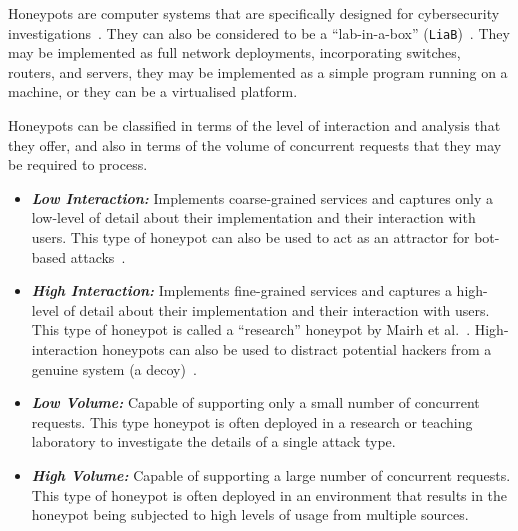 \documentclass{ieeeaccess}
\begin{document}
Honeypots are computer systems that are specifically designed for
cybersecurity investigations~\cite{FKAS:17,BCF:12}. They can also be considered to be a ``lab-in-a-box'' (\texttt{LiaB})~\cite{CFDMH:09}. They may be
implemented as full network deployments, incorporating switches, routers, and
servers, they may be implemented as a simple program running on a machine, or they can be a virtualised platform. 

Honeypots can be classified in terms of the level of interaction and
analysis that they offer, and also in terms of the volume of concurrent requests
that they may be required to process.

\begin{itemize}

  \item \noindent \emph{\textbf{Low Interaction:}} Implements coarse-grained
    services and captures only a low-level of detail about their implementation
    and their interaction with users.  This type of honeypot can also be used
    to act as an attractor for bot-based attacks~\cite{SZB:16}.  

  \item \noindent \emph{\textbf{High Interaction:}} Implements fine-grained
    services and captures a high-level of detail about their implementation and
    their interaction with users.  This type of honeypot is called a
    ``research'' honeypot by Mairh et al.~\cite{MBVJ:11}. High-interaction
    honeypots can also be used to distract potential hackers from a genuine
    system (a decoy)~\cite{M:06,SNKA:12}.

\end{itemize}


\begin{itemize}

  \item \noindent \emph{\textbf{Low Volume:}} Capable of supporting only a
    small number of concurrent requests.  This type honeypot is often deployed
    in a research or teaching laboratory to investigate the details of a single
    attack type.

  \item \noindent \emph{\textbf{High Volume:}} Capable of supporting a large
    number of concurrent requests. This type of honeypot is often deployed in
    an environment that results in the honeypot being subjected to high levels
    of usage from multiple sources. 

\end{itemize}
\end{document}
